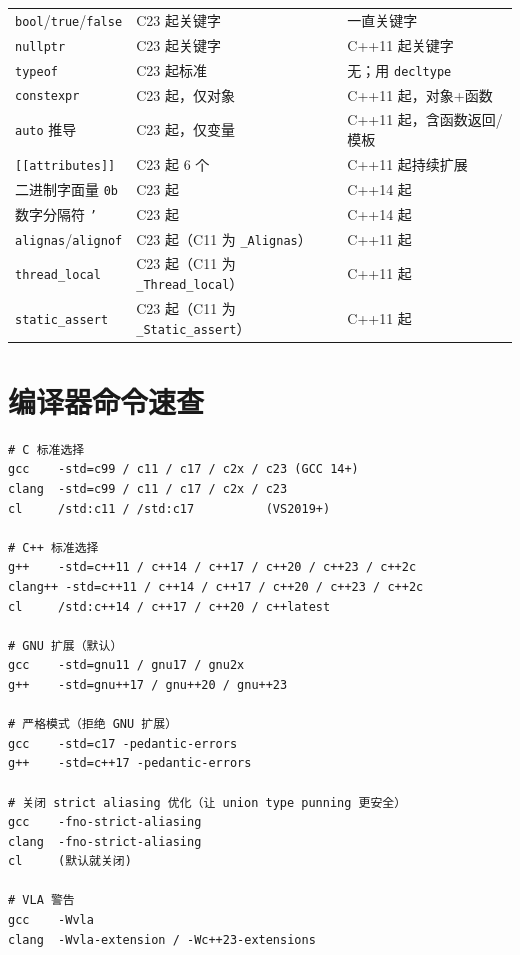 \documentclass[12pt,a4paper,fontset=fandol]{ctexbook}
\newcommand{\shelllabel}{%
  \tcbox[on line,colback=bashheadbg,colframe=bashheadbg,
    boxrule=0pt,arc=1pt,left=2pt,right=2pt,top=1pt,bottom=1pt,
    colupper=white,fontupper=\scriptsize\bfseries]{Shell}}
\newcommand{\kw}[1]{\texttt{#1}}
\begin{document}
\begin{longtable}{@{}>{\raggedright\arraybackslash}p{4.5cm} >{\raggedright\arraybackslash}p{5.0cm} >{\raggedright\arraybackslash}p{5.0cm}@{}}
\kw{bool}/\allowbreak{}\kw{true}/\allowbreak{}\kw{false} & C23 起关键字 & 一直关键字 \\
\kw{nullptr} & C23 起关键字 & C++11 起关键字 \\
\kw{typeof} & C23 起标准 & 无；用 \kw{decltype} \\
\kw{constexpr} & C23 起，仅对象 & C++11 起，对象+函数 \\
\kw{auto} 推导 & C23 起，仅变量 & C++11 起，含函数返回/模板 \\
\kw{[[attributes]]} & C23 起 6 个 & C++11 起持续扩展 \\
二进制字面量 \kw{0b} & C23 起 & C++14 起 \\
数字分隔符 \kw{'} & C23 起 & C++14 起 \\
\kw{alignas}/\allowbreak{}\kw{alignof} & C23 起（C11 为 \kw{\_Alignas}） & C++11 起 \\
\kw{thread\_\allowbreak{}local} & C23 起（C11 为 \kw{\_\allowbreak{}Thread\_\allowbreak{}local}） & C++11 起 \\
\kw{static\_\allowbreak{}assert} & C23 起（C11 为 \kw{\_\allowbreak{}Static\_\allowbreak{}assert}） & C++11 起 \\
\end{longtable}
\normalsize

\section{编译器命令速查}

\shelllabel{}
\begin{lstlisting}[style=bashstyle]
# C 标准选择
gcc    -std=c99 / c11 / c17 / c2x / c23 (GCC 14+)
clang  -std=c99 / c11 / c17 / c2x / c23
cl     /std:c11 / /std:c17          (VS2019+)

# C++ 标准选择
g++    -std=c++11 / c++14 / c++17 / c++20 / c++23 / c++2c
clang++ -std=c++11 / c++14 / c++17 / c++20 / c++23 / c++2c
cl     /std:c++14 / c++17 / c++20 / c++latest

# GNU 扩展（默认）
gcc    -std=gnu11 / gnu17 / gnu2x
g++    -std=gnu++17 / gnu++20 / gnu++23

# 严格模式（拒绝 GNU 扩展）
gcc    -std=c17 -pedantic-errors
g++    -std=c++17 -pedantic-errors

# 关闭 strict aliasing 优化（让 union type punning 更安全）
gcc    -fno-strict-aliasing
clang  -fno-strict-aliasing
cl     (默认就关闭)

# VLA 警告
gcc    -Wvla
clang  -Wvla-extension / -Wc++23-extensions
\end{lstlisting}
\end{document}
